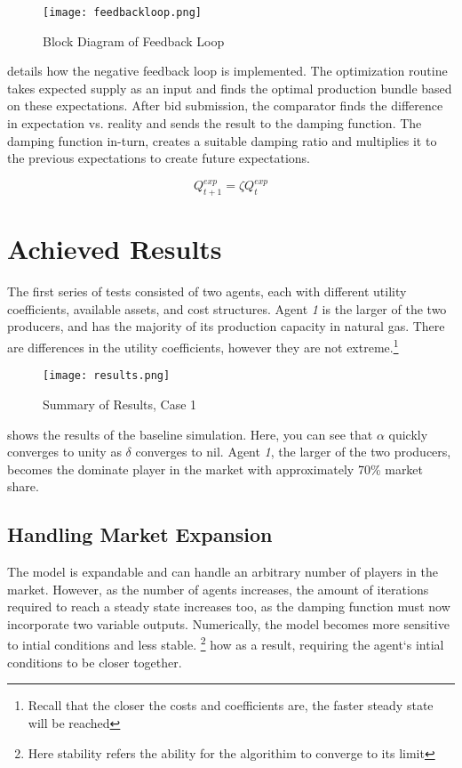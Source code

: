\documentclass{article}
\begin{document}
	\begin{figure}[ht!]
		\begin{center}
		\texttt{[image: feedbackloop.png]}
		\caption{Block Diagram of Feedback Loop}
		\label{feedback}
		\end{center}
	\end{figure}

  details how the negative feedback loop is implemented. The optimization routine takes expected supply as an input and finds the optimal production bundle based on these expectations. After bid submission, the comparator finds the difference in expectation vs. reality and sends the result to the damping function. The damping function in-turn, creates a suitable damping ratio and multiplies it to the previous expectations to create future expectations. 

 	\begin{equation}
 		Q_{t+1}^{exp} = \zeta Q_{t}^{exp}
 	\end{equation}



\section{Achieved Results}
The first series of tests consisted of two agents, each with different utility coefficients, available assets, and cost structures. Agent \emph{1} is the larger of the two producers, and has the majority of its production capacity in natural gas. There are differences in the utility coefficients, however they are not extreme.\footnote{Recall that the closer the costs and coefficients are, the faster steady state will be reached}

	\begin{figure}[ht!]
		\begin{center}
		\texttt{[image: results.png]}
		\caption{Summary of Results, Case 1}
		\label{results1}
		\end{center}
	\end{figure}

 shows the results of the baseline simulation. Here, you can see that $ \alpha $ quickly converges to unity as $\delta$ converges to nil. Agent \emph{1}, the larger of the two producers, becomes the dominate player in the market with approximately 70\% market share. \*


\subsection{Handling Market Expansion}
The model is expandable and can handle an arbitrary number of players in the market. However, as the number of agents increases, the amount of iterations required to reach a steady state increases too, as the damping function must now incorporate two variable outputs. Numerically, the model becomes more sensitive to intial conditions and less stable. \footnote{Here stability refers the ability for the algorithim to converge to its limit} how  as a result, requiring the agent`s intial conditions to be closer together. 
\end{document}
